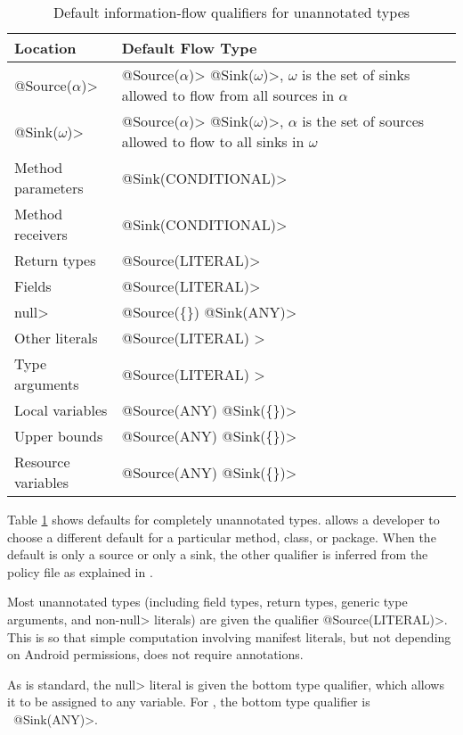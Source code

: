 \begin{table}
  \caption{Default information-flow qualifiers for unannotated types}
  \begin{tabular}{l l}
  \hline
    \bf{Location} & \bf{Default Flow Type}\\
  \hline
     \<@Source($\alpha$)>&\<@Source($\alpha$)>
       \<@Sink($\omega$)>,  $\omega$ is the set of  sinks allowed to flow from all sources in $\alpha$ \\
     \<@Sink($\omega$)>&\<@Source($\alpha$)>
       \<@Sink($\omega$)>, $\alpha$ is the set of  sources allowed to flow to all sinks in $\omega$ \\
    Method parameters &  \<@Sink(CONDITIONAL)> \\
    Method receivers &  \<@Sink(CONDITIONAL)> \\
    Return types &  \<@Source(LITERAL)> \\
    Fields &  \<@Source(LITERAL)> \\
    \<null> &  \<@Source(\{\}) @Sink(ANY)>\\
    Other literals & \<@Source(LITERAL) >\\
    Type arguments & \<@Source(LITERAL) >\\
    Local variables &   \<@Source(ANY) @Sink(\{\})> \\
    Upper bounds &   \<@Source(ANY) @Sink(\{\})> \\
    Resource variables  &   \<@Source(ANY) @Sink(\{\})> \\
  
  \end{tabular}

  \label{tab:defaults}
\end{table}

Table \ref{tab:defaults} shows defaults for completely unannotated types.
\TheFlowChecker allows a developer to choose a different default for a
particular method, class, or package.
When the default is only a source or only a sink, the other qualifier is
inferred from the policy file as explained in
.

Most unannotated types (including field types, return
types, generic type arguments, and non-\<null>
literals) are given the qualifier \<@Source(LITERAL)>.  
This is so that simple computation involving manifest literals, but not
depending on Android permissions, does not require 
annotations. 

As is standard, the \<null> literal is given the bottom type qualifier, which allows it to be assigned to any variable.
For \theFlowChecker, the bottom type qualifier is \srcnone\  \<@Sink(ANY)>.



